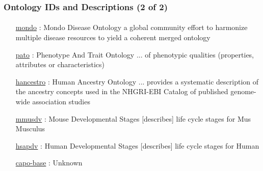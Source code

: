 \documentclass[aspectratio=169,xcolor=dvipsnames]{beamer}
\begin{document}
\begin{frame}
  \frametitle{Ontology IDs and Descriptions (2 of 2)}
  \framesubtitle{}
  \begin{itemize}\footnotesize
  \item[\href{"http://purl.obolibrary.org/obo/mondo/mondo-simple.owl"}{mondo}]:
    Mondo Disease Ontology a global community effort to harmonize
    multiple disease resources to yield a coherent merged ontology
  \item[\href{"http://purl.obolibrary.org/obo/pato.owl"}{pato}]:
    Phenotype And Trait Ontology ... of phenotypic qualities
    (properties, attributes or characteristics)
  \item[\href{"http://purl.obolibrary.org/obo/hancestro/hancestro.owl"}{hancestro}]:
    Human Ancestry Ontology ... provides a systematic description of
    the ancestry concepts used in the NHGRI-EBI Catalog of published
    genome-wide association studies
  \item[\href{"http://purl.obolibrary.org/obo/mmusdv.owl"}{mmusdv}]:
    Mouse Developmental Stages [describes] life cycle stages for Mus
    Musculus
  \item[\href{"http://purl.obolibrary.org/obo/hsapdv.owl"}{hsapdv}]:
    Human Developmental Stages [describes] life cycle stages for Human
  \item[\href{"https://raw.githubusercontent.com/kharchenkolab/cap_ontology/main/capo-base.owl"}{capo-base}]:
    Unknown
  \end{itemize}
\end{frame}
\end{document}
